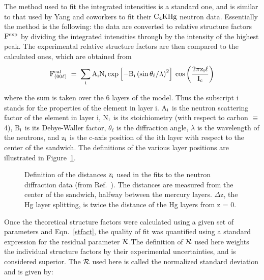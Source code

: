         The  method used to  fit the  integrated intensities is  a standard
one, and is similar to that used by Yang and  coworkers  to fit their $\rm
C_4KHg$ neutron  data.\cite{yang84}   Essentially  the   method  is the
following:  the data are  converted   to  relative  structure factors  $\rm
F^{exp}$ by dividing the integrated intensities through by the intensity of
the highest peak.  The experimental relative structure factors are then
compared to the calculated ones, which are obtained from\\

\begin{equation}
\label{stfact}
\rm F^{cal}_{(00\ell)} \; = \; \sum_i A_i N_i \exp{ \left[ -B_i \left( \sin \theta_{\ell}/ \lambda \right)^2 \right]} \: \cos \left( \frac{2 \pi z_i \ell}{I_c} \right)
\end{equation}

\noindent where the sum is taken  over the 6 layers of the model. Thus the
subscript i stands for the properties of the element in layer i.  A$\rm _i$
is the neutron scattering  factor  of the element in layer  i, N$\rm _i$ is
its stoichiometry (with  respect  to carbon  $\equiv$ 4), B$\rm _i$ is  its
Debye-Waller factor, $\theta_{\ell}$ is the diffraction angle, $\lambda$ is
the wavelength of the neutrons, and z$\rm _i$ is the c-axis position of the
ith layer with respect to the center  of the sandwich.   The definitions of
the various layer positions are illustrated in Figure~\ref{zeedef}.

\begin{figure}
\vspace{12cm}
\caption[Definition of the distances used in the fits to the neutron
diffraction data.]{Definition of the distances $\rm z_i$ used  in  the fits
to  the neutron diffraction  data (from Ref.~\cite{yang84}).  The distances
are  measured from the center of  the sandwich, halfway between the mercury
layers.  $\Delta$z, the Hg layer splitting, is twice the distance of the Hg
layers from z = 0.}
\label{zeedef}
\end{figure}


        Once  the theoretical structure  factors  were calculated  using  a
given set of  parameters  and  Eqn.~\ref{stfact}, the  quality  of fit  was
quantified  using a standard  expression for  the residual  parameter $\cal
R$.\cite{hamilton65}The  definition  of  $\cal  R$  used  here  weights the
individual structure factors  by  their experimental uncertainties, and  is
considered  superior.\cite{ali88}  The $\cal R$ used here is called the
normalized standard deviation and is given by:\cite{hamilton65}

